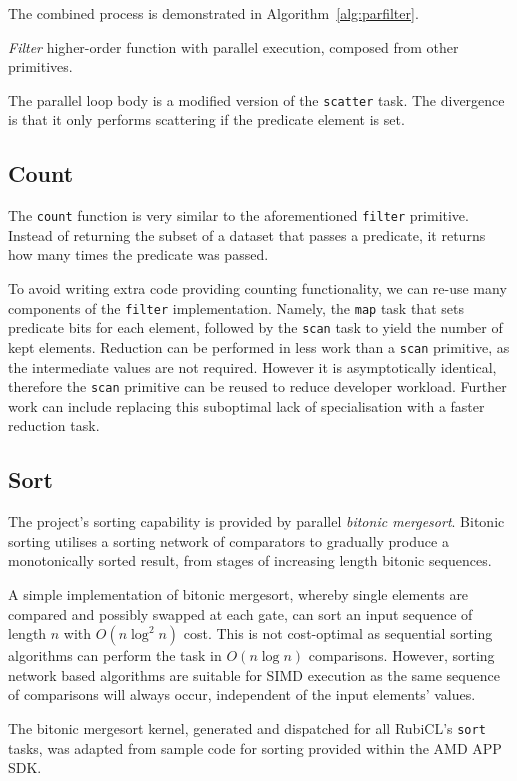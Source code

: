 The combined process is demonstrated in Algorithm~\ref{alg:parfilter}.

\begin{algorithm}
  \caption{\emph{Filter} higher-order function with parallel execution, composed from other primitives.}
  \label{alg:parfilter}

  \begin{algorithmic}
      \EndIf
    \EndPFor
    \EndFunction
  \end{algorithmic}
\end{algorithm}

The parallel loop body is a modified version of the \verb|scatter| task. The divergence is that it only performs scattering if the predicate element is set.

\subsection{Count}
The \verb|count| function is very similar to the aforementioned \verb|filter| primitive.
Instead of returning the subset of a dataset that passes a predicate, it returns how many times the predicate was passed.

To avoid writing extra code providing counting functionality, we can re-use many components of the \verb|filter| implementation. Namely, the \verb|map| task that sets predicate bits for each element, followed by the \verb|scan| task to yield the number of kept elements. Reduction can be performed in  less work than a \verb|scan| primitive, as the intermediate values are not required. However it is asymptotically identical, therefore the \verb|scan| primitive can be reused to reduce developer workload.
Further work can include replacing this suboptimal lack of specialisation with a faster reduction task.


\subsection{Sort}
The project's sorting capability is provided by parallel \emph{bitonic mergesort}. Bitonic sorting utilises a sorting network of comparators to gradually produce a monotonically sorted result, from stages of increasing length bitonic sequences.

A simple implementation of bitonic mergesort, whereby single elements are compared and possibly swapped at each gate, can sort an input sequence of length $n$ with $O(n \log^2 n)$ cost. This is not cost-optimal as sequential sorting algorithms can perform the task in $O(n \log n)$ comparisons. However, sorting network based algorithms are suitable for \ac{SIMD} execution as the same sequence of comparisons will always occur, independent of the input elements' values.

The bitonic mergesort kernel, generated and dispatched for all RubiCL's \verb|sort| tasks, was adapted from sample code for sorting provided within the \ac{AMD} APP SDK.
